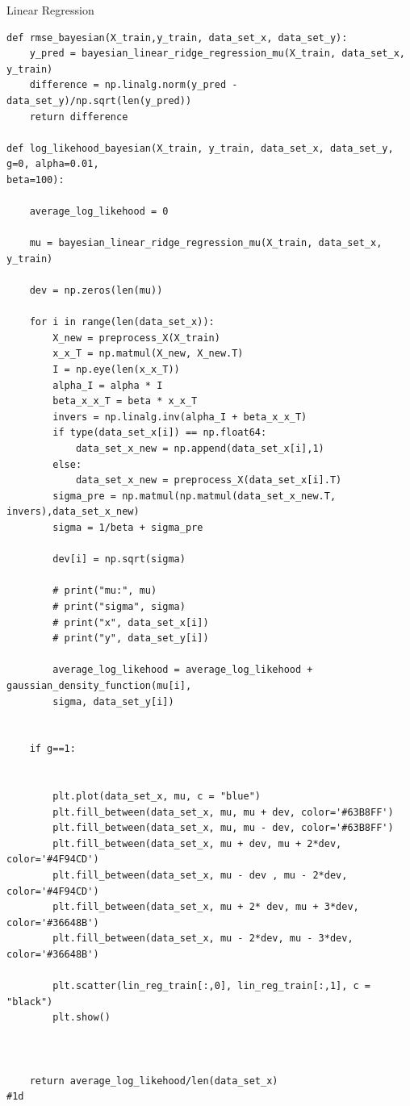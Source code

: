 \begin{task}{Linear Regression}
\begin{subtask}
\begin{lstlisting}
def rmse_bayesian(X_train,y_train, data_set_x, data_set_y):
    y_pred = bayesian_linear_ridge_regression_mu(X_train, data_set_x, y_train)
    difference = np.linalg.norm(y_pred - data_set_y)/np.sqrt(len(y_pred))
    return difference

def log_likehood_bayesian(X_train, y_train, data_set_x, data_set_y, g=0, alpha=0.01, 
beta=100):
    
    average_log_likehood = 0
    
    mu = bayesian_linear_ridge_regression_mu(X_train, data_set_x, y_train)
    
    dev = np.zeros(len(mu))
    
    for i in range(len(data_set_x)):
        X_new = preprocess_X(X_train)
        x_x_T = np.matmul(X_new, X_new.T)
        I = np.eye(len(x_x_T))
        alpha_I = alpha * I
        beta_x_x_T = beta * x_x_T
        invers = np.linalg.inv(alpha_I + beta_x_x_T)
        if type(data_set_x[i]) == np.float64:
            data_set_x_new = np.append(data_set_x[i],1)
        else:
            data_set_x_new = preprocess_X(data_set_x[i].T)
        sigma_pre = np.matmul(np.matmul(data_set_x_new.T, invers),data_set_x_new)
        sigma = 1/beta + sigma_pre
        
        dev[i] = np.sqrt(sigma)

        # print("mu:", mu)
        # print("sigma", sigma)
        # print("x", data_set_x[i])
        # print("y", data_set_y[i])
        
        average_log_likehood = average_log_likehood + gaussian_density_function(mu[i], 
        sigma, data_set_y[i])

        
    if g==1:
        
        
        plt.plot(data_set_x, mu, c = "blue")
        plt.fill_between(data_set_x, mu, mu + dev, color='#63B8FF')
        plt.fill_between(data_set_x, mu, mu - dev, color='#63B8FF')
        plt.fill_between(data_set_x, mu + dev, mu + 2*dev, color='#4F94CD')
        plt.fill_between(data_set_x, mu - dev , mu - 2*dev, color='#4F94CD')
        plt.fill_between(data_set_x, mu + 2* dev, mu + 3*dev, color='#36648B')
        plt.fill_between(data_set_x, mu - 2*dev, mu - 3*dev, color='#36648B')
        
        plt.scatter(lin_reg_train[:,0], lin_reg_train[:,1], c = "black")
        plt.show()
    
    
        
    return average_log_likehood/len(data_set_x)
#1d
    

\end{lstlisting}
\end{subtask}
\end{task}

